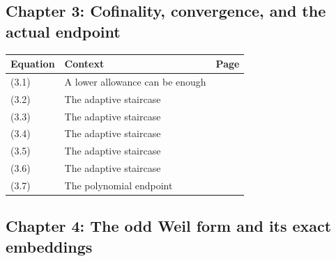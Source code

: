 \documentclass[
  10pt,
  a4paper,
  10pt,
  oneside,
  openany]{book}
\begin{document}
\subsection{Chapter 3: Cofinality, convergence, and the actual
endpoint}\label{chapter-3-cofinality-convergence-and-the-actual-endpoint}

\begin{longtable}[]{@{}llr@{}}
\toprule\noalign{}
Equation & Context & Page \\
\midrule\noalign{}
\endhead
\bottomrule\noalign{}
\endlastfoot
(3.1) & A lower allowance can be enough & \pageref{eq:3.1} \\
(3.2) & The adaptive staircase & \pageref{eq:3.2} \\
(3.3) & The adaptive staircase & \pageref{eq:3.3} \\
(3.4) & The adaptive staircase & \pageref{eq:3.4} \\
(3.5) & The adaptive staircase & \pageref{eq:3.5} \\
(3.6) & The adaptive staircase & \pageref{eq:3.6} \\
(3.7) & The polynomial endpoint & \pageref{eq:3.7} \\
\end{longtable}

\subsection{Chapter 4: The odd Weil form and its exact
embeddings}\label{chapter-4-the-odd-weil-form-and-its-exact-embeddings}
\end{document}
